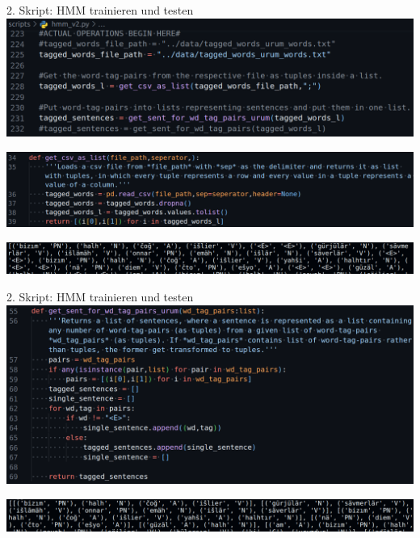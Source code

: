 \documentclass{beamer}
\begin{document}
\begin{frame}[t]{2. Skript: HMM trainieren und testen}
	\includegraphics[scale=0.5]{"./pics/hmm_script_pics/01.png"}
	
	\medskip
	
	\includegraphics[scale=0.43]{"./pics/hmm_script_pics/02.png"}
	
	\medskip
	
	\includegraphics[scale=0.4]{"./pics/hmm_script_pics/14.png"}
\end{frame}

\begin{frame}[t]{2. Skript: HMM trainieren und testen}
	\includegraphics[scale=0.43]{"./pics/hmm_script_pics/03.png"}
	
	\medskip
	
	\includegraphics[scale=0.4]{"./pics/hmm_script_pics/15.png"}
\end{frame}
\end{document}
